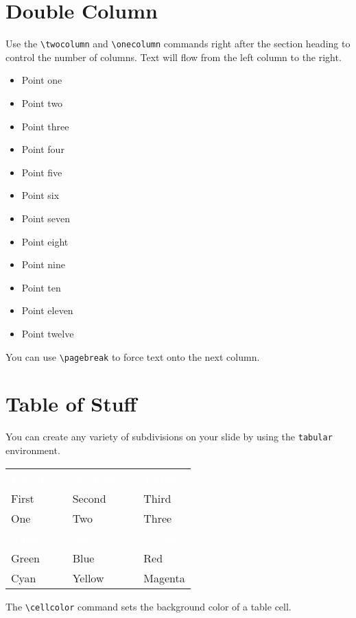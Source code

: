 \documentclass{antclass}
\begin{document}
\section{Double Column}\twocolumn\raggedright

Use the \verb|\twocolumn| and \verb|\onecolumn| commands right after the section
heading to control the number of columns. Text will flow from the left column to
the right.
\begin{itemize}
    \item Point one
    \item Point two
    \item Point three
    \item Point four
    \item Point five
    \item Point six
    \item Point seven
    \item Point eight
    \item Point nine
    \item Point ten
    \item Point eleven
    \item Point twelve
\end{itemize}
You can use \verb|\pagebreak| to force text onto the next column.

\section{Table of Stuff}

You can create any variety of subdivisions on your slide by using the
\verb|tabular| environment.
\begin{center}
\begin{tabular}{C{0.25\textwidth}cC{0.25\textwidth}cC{0.25\textwidth}}
    \textcolor{white}{Primary}\strut &&
    \textcolor{white}{Secondary}\strut &&
    \textcolor{white}{Tertiary}\strut \\
    First && Second && Third \\
    One && Two && Three \\[1em]
    \textcolor{white}{Alpha}\strut &&
    \textcolor{white}{Beta}\strut &&
    \textcolor{white}{Gamma}\strut \\
    Green && Blue && Red \\
    Cyan && Yellow && Magenta
\end{tabular}
\end{center}
The \verb|\cellcolor| command sets the background color of a table cell.
\end{document}
